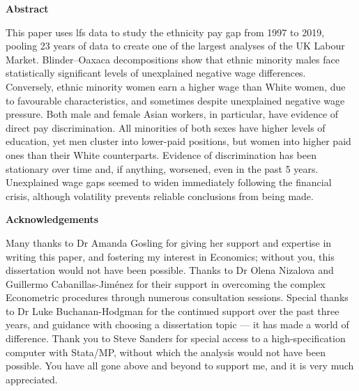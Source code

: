 \documentclass[class=article, crop=false]{standalone}
\begin{document}
\thispagestyle{plain}
\begin{center}
   \textbf{Abstract} 
\end{center}
This paper uses \acrlong{lfs} data to study the ethnicity pay gap from 1997 to 2019, pooling 23 years of data to create one of the largest analyses of the UK Labour Market. Blinder–Oaxaca decompositions show that ethnic minority males face statistically significant levels of unexplained negative wage differences. Conversely, ethnic minority women earn a higher wage than White women, due to favourable characteristics, and sometimes despite unexplained negative wage pressure. Both male and female Asian workers, in particular, have evidence of  direct pay discrimination. All minorities of both sexes have higher levels of education, yet men cluster into lower-paid positions, but women into higher paid ones than their White counterparts. Evidence of discrimination has been stationary over time and, if anything, worsened, even in the past 5 years. Unexplained wage gaps seemed to widen immediately following the financial crisis, although volatility prevents reliable conclusions from being made.


\vspace{50pt}
\begin{center}
   \textbf{Acknowledgements}
\end{center}
\linebreak
Many thanks to Dr Amanda Gosling for giving her support and expertise in writing this paper, and fostering my interest in Economics; without you, this dissertation would not have been possible. Thanks to Dr Olena Nizalova and Guillermo Cabanillas-Jiménez for their support in overcoming the complex Econometric procedures through numerous consultation sessions. Special thanks to Dr Luke Buchanan-Hodgman for the continued support over the past three years, and guidance with choosing a dissertation topic --- it has made a world of difference. Thank you to Steve Sanders for special access to a high-specification computer with Stata/MP, without which the analysis would not have been possible. You have all gone above and beyond to support me, and it is very much appreciated.
\end{document}
